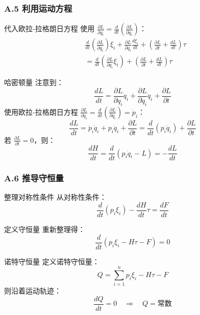 \documentclass[xcolor=dvipsnames]{ctexbeamer}
\begin{document}
\begin{frame}
\frametitle{A.5 利用运动方程}
\begin{block}{代入欧拉-拉格朗日方程}
使用 $\frac{\partial L}{\partial q_i} = \frac{d}{dt}\left(\frac{\partial L}{\partial \dot{q}_i}\right)$：
\begin{align*}
&\frac{d}{dt}\left(\frac{\partial L}{\partial \dot{q}_i}\right)\xi_i + \frac{\partial L}{\partial \dot{q}_i}\frac{d\xi_i}{dt} + \left(\frac{\partial L}{\partial t} + \frac{dL}{dt}\right)\tau \\
&= \frac{d}{dt}\left(\frac{\partial L}{\partial \dot{q}_i}\xi_i\right) + \left(\frac{\partial L}{\partial t} + \frac{dL}{dt}\right)\tau
\end{align*}
\end{block}

\pause

\begin{block}{哈密顿量}
注意到：
$$\frac{dL}{dt} = \frac{\partial L}{\partial q_i}\dot{q}_i + \frac{\partial L}{\partial \dot{q}_i}\ddot{q}_i + \frac{\partial L}{\partial t}$$
使用欧拉-拉格朗日方程 $\frac{\partial L}{\partial q_i} = \frac{d}{dt}\left(\frac{\partial L}{\partial \dot{q}_i}\right) = \dot{p}_i$：
$$\frac{dL}{dt} = \dot{p}_i\dot{q}_i + p_i\ddot{q}_i + \frac{\partial L}{\partial t} = \frac{d}{dt}(p_i\dot{q}_i) + \frac{\partial L}{\partial t}$$
若 $\frac{\partial L}{\partial t} = 0$，则：
$$\frac{dH}{dt} = \frac{d}{dt}(p_i\dot{q}_i - L) = -\frac{dL}{dt}$$
\end{block}
\end{frame}

\begin{frame}
\frametitle{A.6 推导守恒量}
\begin{block}{整理对称性条件}
从对称性条件：
$$\frac{d}{dt}\left(p_i \xi_i\right) - \frac{dH}{dt}\tau = \frac{dF}{dt}$$
\end{block}

\pause

\begin{block}{定义守恒量}
重新整理得：
$$\frac{d}{dt}\left(p_i \xi_i - H\tau - F\right) = 0$$
\end{block}

\pause

\begin{alertblock}{诺特守恒量}
定义诺特守恒量：
$$Q = \sum_{i=1}^n p_i \xi_i - H\tau - F$$
则沿着运动轨迹：
$$\frac{dQ}{dt} = 0 \quad \Rightarrow \quad Q = \text{常数}$$
\end{alertblock}
\end{frame}
\end{document}
